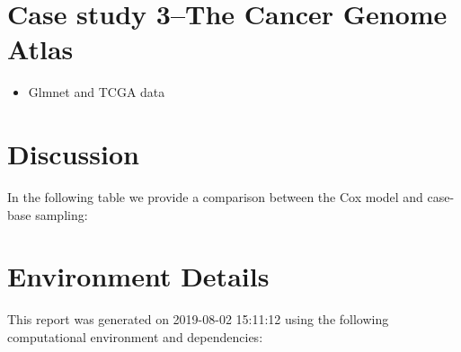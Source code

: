 \documentclass[
]{jss}
\providecommand{\tightlist}{%
  \setlength{\itemsep}{0pt}\setlength{\parskip}{0pt}}
\begin{document}
\hypertarget{case-study-3the-cancer-genome-atlas}{%
\section{Case study 3--The Cancer Genome
Atlas}\label{case-study-3the-cancer-genome-atlas}}

\begin{itemize}
\tightlist
\item
  Glmnet and TCGA data
\end{itemize}

\hypertarget{discussion}{%
\section{Discussion}\label{discussion}}

In the following table we provide a comparison between the Cox model and
case-base sampling:

\hypertarget{environment-details}{%
\section{Environment Details}\label{environment-details}}

This report was generated on 2019-08-02 15:11:12 using the following
computational environment and dependencies:
\end{document}
